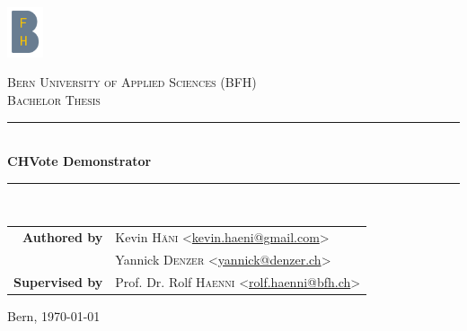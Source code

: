 \begin{titlepage}
\begin{center}
	\includegraphics[width=0.08\textwidth]{assets/bfh_logo.png}

	\vspace{1cm}

	\textsc{\LARGE Bern University of Applied Sciences (BFH)} \\[1.5cm]
	\textsc{\Large Bachelor Thesis} \\[0.5cm]

	\newcommand{\HRule}{\rule{\linewidth}{0.3mm}}
	\HRule \\[0.4cm]
	{\huge \bfseries CHVote Demonstrator} \\[0.3cm]
	\HRule \\[1.5cm]

	\begin{tabular}{rl}
	\textbf{Authored by}
	& Kevin \textsc{Häni} <\href{mailto:kevin.haeni@gmail.com}{kevin.haeni@gmail.com}> \\
	& Yannick \textsc{Denzer} <\href{mailto:yannick@denzer.ch}{yannick@denzer.ch}> \\
	\textbf{Supervised by}
	& Prof. Dr. Rolf \textsc{Haenni} <\href{mailto:rolf.haenni@bfh.ch}{rolf.haenni@bfh.ch}> \\
	\end{tabular}

	\vspace{1.5cm}


	\vfill

	Bern, {\large \today}
\end{center}
\end{titlepage}
